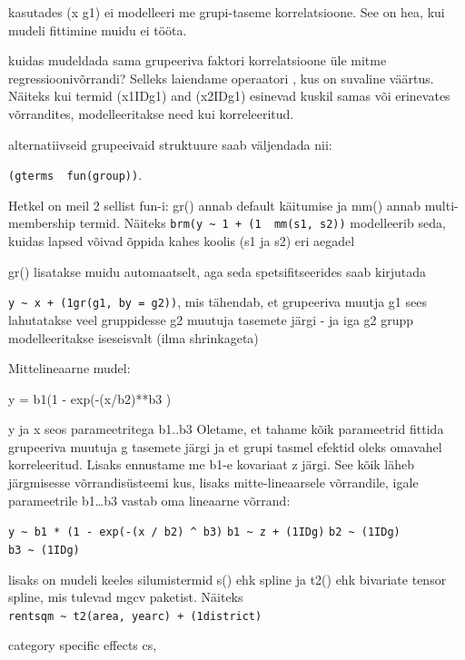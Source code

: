 \documentclass[]{book}
\begin{document}
\textbar{}\textbar{} kasutades (x \textbar{}\textbar{} g1) ei modelleeri
me grupi-taseme korrelatsioone. See on hea, kui mudeli fittimine muidu
ei tööta.

kuidas mudeldada sama grupeeriva faktori korrelatsioone üle mitme
regressioonivõrrandi? Selleks laiendame \textbar{} operaatori
\textbar{}\textbar{}, kus on suvaline väärtus. Näiteks kui termid
(x1\textbar{}ID\textbar{}g1) and (x2\textbar{}ID\textbar{}g1) esinevad
kuskil samas või erinevates võrrandites, modelleeritakse need kui
korreleeritud.

alternatiivseid grupeeivaid struktuure saab väljendada nii:

\texttt{(gterms\ \textbar{}\ fun(group))}.

Hetkel on meil 2 sellist fun-i: gr() annab default käitumise ja mm()
annab multi-membership termid. Näiteks
\texttt{brm(y\ \textasciitilde{}\ 1\ +\ (1\ \textbar{}\ mm(s1,\ s2))}
modelleerib seda, kuidas lapsed võivad õppida kahes koolis (s1 ja s2)
eri aegadel

gr() lisatakse muidu automaatselt, aga seda spetsifitseerides saab
kirjutada

\texttt{y\ \textasciitilde{}\ x\ +\ (1\textbar{}gr(g1,\ by\ =\ g2))},
mis tähendab, et grupeeriva muutja g1 sees lahutatakse veel gruppidesse
g2 muutuja tasemete järgi - ja iga g2 grupp modelleeritakse iseseisvalt
(ilma shrinkageta)

Mittelineaarne mudel:

y = b1(1 - exp(-(x/b2)**b3 )

y ja x seos parameetritega b1..b3 Oletame, et tahame kõik parameetrid
fittida grupeeriva muutuja g tasemete järgi ja et grupi tasmel efektid
oleks omavahel korreleeritud. Lisaks ennustame me b1-e kovariaat z
järgi. See kõik läheb järgmisesse võrrandisüsteemi kus, lisaks
mitte-lineaarsele võrrandile, igale parameetrile b1\ldots{}b3 vastab oma
lineaarne võrrand:

\texttt{y\ \textasciitilde{}\ b1\ *\ (1\ -\ exp(-(x\ /\ b2)\ \^{}\ b3)}
\texttt{b1\ \textasciitilde{}\ z\ +\ (1\textbar{}ID\textbar{}g)}
\texttt{b2\ \textasciitilde{}\ (1\textbar{}ID\textbar{}g)}
\texttt{b3\ \textasciitilde{}\ (1\textbar{}ID\textbar{}g)}

lisaks on mudeli keeles silumistermid s() ehk spline ja t2() ehk
bivariate tensor spline, mis tulevad mgcv paketist. Näiteks
\texttt{rentsqm\ \textasciitilde{}\ t2(area,\ yearc)\ +\ (1\textbar{}district)}

category specific effects cs,
\end{document}
